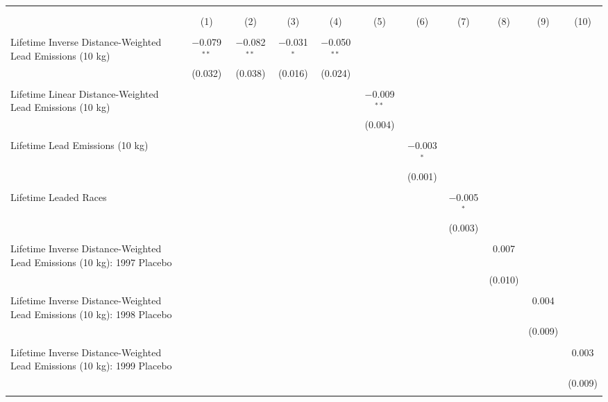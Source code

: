 

\begin{tabular}{@{\extracolsep{5pt}}lcccccccccc} 
\\[-1.8ex]\hline 
\hline \\[-1.8ex] 
\\[-1.8ex] & (1) & (2) & (3) & (4) & (5) & (6) & (7) & (8) & (9) & (10)\\ 
\hline \\[-1.8ex] 
 Lifetime Inverse Distance-Weighted Lead Emissions (10 kg) & $-$0.079$^{**}$ & $-$0.082$^{**}$ & $-$0.031$^{*}$ & $-$0.050$^{**}$ &  &  &  &  &  &  \\ 
  & (0.032) & (0.038) & (0.016) & (0.024) &  &  &  &  &  &  \\ 
  & & & & & & & & & & \\ 
 Lifetime Linear Distance-Weighted Lead Emissions (10 kg) &  &  &  &  & $-$0.009$^{**}$ &  &  &  &  &  \\ 
  &  &  &  &  & (0.004) &  &  &  &  &  \\ 
  & & & & & & & & & & \\ 
 Lifetime Lead Emissions (10 kg) &  &  &  &  &  & $-$0.003$^{*}$ &  &  &  &  \\ 
  &  &  &  &  &  & (0.001) &  &  &  &  \\ 
  & & & & & & & & & & \\ 
 Lifetime Leaded Races &  &  &  &  &  &  & $-$0.005$^{*}$ &  &  &  \\ 
  &  &  &  &  &  &  & (0.003) &  &  &  \\ 
  & & & & & & & & & & \\ 
 Lifetime Inverse Distance-Weighted Lead Emissions (10 kg): 1997 Placebo &  &  &  &  &  &  &  & 0.007 &  &  \\ 
  &  &  &  &  &  &  &  & (0.010) &  &  \\ 
  & & & & & & & & & & \\ 
 Lifetime Inverse Distance-Weighted Lead Emissions (10 kg): 1998 Placebo &  &  &  &  &  &  &  &  & 0.004 &  \\ 
  &  &  &  &  &  &  &  &  & (0.009) &  \\ 
  & & & & & & & & & & \\ 
 Lifetime Inverse Distance-Weighted Lead Emissions (10 kg): 1999 Placebo &  &  &  &  &  &  &  &  &  & 0.003 \\ 
  &  &  &  &  &  &  &  &  &  & (0.009) \\ 
  & & & & & & & & & & \\ 

\end{tabular}
